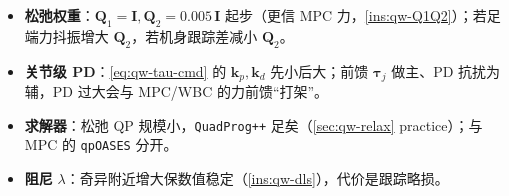 \begin{practice}
\begin{itemize}
  \item \textbf{松弛权重}：$\boldsymbol{Q}_1=\mathbf{I},\boldsymbol{Q}_2=0.005\,\mathbf{I}$ 起步（更信 MPC 力，\cref{ins:qw-Q1Q2}）；若足端力抖振增大 $\boldsymbol{Q}_2$，若机身跟踪差减小 $\boldsymbol{Q}_2$。
  \item \textbf{关节级 PD}：\cref{eq:qw-tau-cmd} 的 $\boldsymbol{k}_p,\boldsymbol{k}_d$ 先小后大；前馈 $\boldsymbol{\tau}_j$ 做主、PD 抗扰为辅，PD 过大会与 MPC/WBC 的力前馈“打架”。
  \item \textbf{求解器}：松弛 QP 规模小，\texttt{QuadProg++} 足矣（\cref{sec:qw-relax} practice）；与 MPC 的 \texttt{qpOASES} 分开。
  \item \textbf{阻尼} $\lambda$：奇异附近增大保数值稳定（\cref{ins:qw-dls}），代价是跟踪略损。
\end{itemize}
\end{practice}

